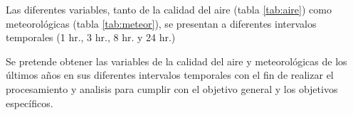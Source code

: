 Las diferentes variables, tanto de la calidad del aire (tabla \ref{tab:aire}) como meteorológicas (tabla \ref{tab:meteor}), se presentan a diferentes intervalos temporales (1 hr., 3 hr., 8 hr. y 24 hr.)

Se pretende obtener las variables de la calidad del aire y meteorológicas de los últimos años en sus diferentes intervalos temporales con el fin de realizar el procesamiento y analisis para cumplir con el objetivo general y los objetivos específicos.